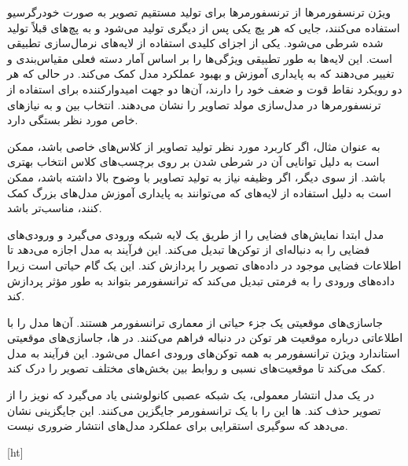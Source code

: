 ویژن ترنسفورمرها از ترنسفورمرها برای تولید مستقیم تصویر به صورت خودرگرسیو استفاده می‌کنند، جایی که هر پچ یکی پس از دیگری تولید می‌شود و به پچ‌های قبلاً تولید شده شرطی می‌شود. یکی از اجزای کلیدی  استفاده از لایه‌های نرمال‌سازی تطبیقی است. این لایه‌ها به طور تطبیقی ویژگی‌ها را بر اساس آمار دسته فعلی مقیاس‌بندی و تغییر می‌دهند که به پایداری آموزش و بهبود عملکرد مدل کمک می‌کند. در حالی که هر دو رویکرد نقاط قوت و ضعف خود را دارند، آن‌ها دو جهت امیدوارکننده برای استفاده از ترنسفورمرها در مدل‌سازی مولد تصاویر را نشان می‌دهند. انتخاب بین  و  به نیازهای خاص مورد نظر بستگی دارد.

به عنوان مثال، اگر کاربرد مورد نظر تولید تصاویر از کلاس‌های خاصی باشد،  ممکن است به دلیل توانایی آن در شرطی شدن بر روی برچسب‌های کلاس انتخاب بهتری باشد. از سوی دیگر، اگر وظیفه نیاز به تولید تصاویر با وضوح بالا داشته باشد،  ممکن است به دلیل استفاده از لایه‌های  که می‌توانند به پایداری آموزش مدل‌های بزرگ کمک کنند، مناسب‌تر باشد.




مدل ابتدا نمایش‌های فضایی را از طریق یک لایه شبکه ورودی می‌گیرد و ورودی‌های فضایی را به دنباله‌ای از توکن‌ها تبدیل می‌کند. این فرآیند به مدل اجازه می‌دهد تا اطلاعات فضایی موجود در داده‌های تصویر را پردازش کند. این یک گام حیاتی است زیرا داده‌های ورودی را به فرمتی تبدیل می‌کند که ترانسفورمر بتواند به طور مؤثر پردازش کند.

جاسازی‌های موقعیتی یک جزء حیاتی از معماری ترانسفورمر هستند. آن‌ها مدل را با اطلاعاتی درباره موقعیت هر توکن در دنباله فراهم می‌کنند. در ها، جاسازی‌های موقعیتی استاندارد ویژن ترانسفورمر به همه توکن‌های ورودی اعمال می‌شود. این فرآیند به مدل کمک می‌کند تا موقعیت‌های نسبی و روابط بین بخش‌های مختلف تصویر را درک کند.

در یک مدل انتشار معمولی، یک شبکه عصبی کانولوشنی یاد می‌گیرد که نویز را از تصویر حذف کند. ها این  را با یک ترانسفورمر جایگزین می‌کنند. این جایگزینی نشان می‌دهد که سوگیری استقرایی  برای عملکرد مدل‌های انتشار ضروری نیست.


[ht]

